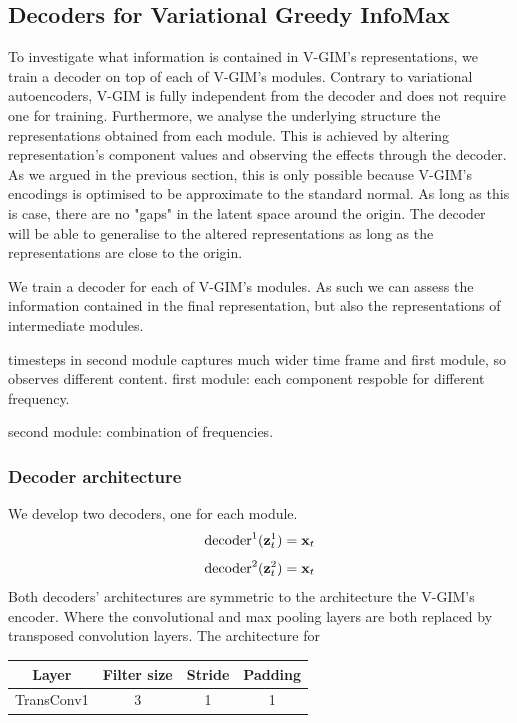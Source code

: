	\subsection{Decoders for Variational Greedy InfoMax}
		To investigate what information is contained in V-GIM's representations, we train a decoder on top of each of V-GIM's modules. Contrary to variational autoencoders, V-GIM is fully independent from the decoder and does not require one for training. Furthermore, we analyse the underlying structure the representations obtained from each module. This is achieved by altering representation's component values and observing the effects through the decoder. As we argued in the previous section, this is only possible because V-GIM's encodings is optimised to be approximate to the standard normal. As long as this is case, there are no "gaps" in the latent space around the origin. The decoder will be able to generalise to the altered representations as long as the representations are close to the origin.
		
		We train a decoder for each of V-GIM's modules. As such we can assess the information contained in the final representation, but also the representations of intermediate modules.
		
		timesteps in second module captures much wider time frame and first module, so observes different content.
		first module: each component respoble for different frequency.
		
		second module:
		combination of frequencies.
		
		\subsubsection{Decoder architecture}
		We develop two decoders, one for each module. 
		$$
			\text{decoder}^1(\mathbf{z}_t^1) = \mathbf{x}_t
		$$
		$$
			\text{decoder}^2(\mathbf{z}_t^2) = \mathbf{x}_t
		$$
		Both decoders' architectures are symmetric to the architecture the V-GIM's encoder. Where the convolutional and max pooling layers are both replaced by transposed convolution layers.
		The architecture for 
		
		\begin{tabular}{|c|c|c|c|}
			\hline
			Layer & Filter size & Stride & Padding \\
			\hline
			TransConv1 & 3 & 1 & 1 \\
			\hline
		\end{tabular}
	
